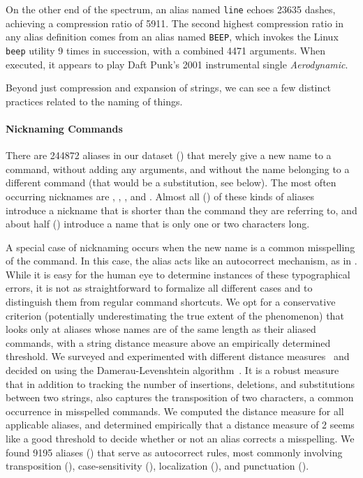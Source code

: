 On the other end of the spectrum, an alias named \texttt{line} echoes \num{23635} dashes, achieving a compression ratio of \num{5911}.
The second highest compression ratio in any alias definition comes from an alias named \verb|BEEP|, which invokes the Linux \verb|beep| utility 9 times in succession, with a combined \num{4471} arguments.
When executed, it appears to play Daft Punk's 2001 instrumental single \emph{Aerodynamic}.

Beyond just compression and expansion of strings, we can see a few distinct practices related to the naming of things.

\paragraph{\bf Nicknaming Commands}

There are \num{244872} aliases in our dataset () that merely give a new name to a command, without adding any arguments, and without the name belonging to a different command (that would be a substitution, see below).
The most often occurring nicknames are , , , and .
Almost all () of these kinds of aliases introduce a nickname that is shorter than the command they are referring to, and about half () introduce a name that is only one or two characters long.

A special case of nicknaming occurs when the new name is a common misspelling of the command.
In this case, the alias acts like an autocorrect mechanism, as in .
While it is easy for the human eye to determine instances of these typographical errors, it is not as straightforward to formalize all different cases and to distinguish them from regular command shortcuts.
We opt for a conservative criterion (potentially underestimating the true extent of the phenomenon) that looks only at aliases whose names are of the same length as their aliased commands, with a string distance measure above an empirically determined threshold.
We surveyed and experimented with different distance measures~\cite{navarro:01} and decided on using the Damerau-Levenshtein algorithm~\cite{damerau:64}.
It is a robust measure that in addition to tracking the number of insertions, deletions, and substitutions between two strings, also captures the transposition of two characters, a common occurrence in misspelled commands.
We computed the distance measure for all applicable aliases, and determined empirically that a distance measure of 2 seems like a good threshold to decide whether or not an alias corrects a misspelling.
We found \num{9195} aliases () that serve as autocorrect rules, most commonly involving transposition (), case-sensitivity (), localization (), and punctuation ().

